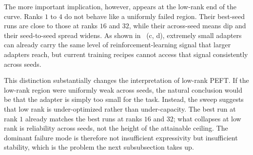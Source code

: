 \documentclass{llmxive}
\begin{document}
The more important implication, however, appears at the low-rank end of the curve. Ranks $1$ to $4$ do not behave like a uniformly failed region. Their best-seed runs are close to those at ranks $16$ and $32$, while their across-seed means dip and their seed-to-seed spread widens. As shown in ~(c, d), extremely small adapters can already carry the same level of reinforcement-learning signal that larger adapters reach, but current training recipes cannot access that signal consistently across seeds.

This distinction substantially changes the interpretation of low-rank PEFT. If the low-rank region were uniformly weak across seeds, the natural conclusion would be that the adapter is simply too small for the task. Instead, the sweep suggests that low rank is under-optimized rather than under-capacity. The best run at rank $1$ already matches the best runs at ranks $16$ and $32$; what collapses at low rank is reliability across seeds, not the height of the attainable ceiling. The dominant failure mode is therefore not insufficient expressivity but insufficient stability, which is the problem the next subsubsection takes up.
\end{document}
